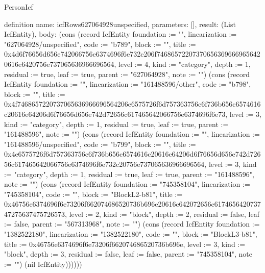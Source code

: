 \begin{lexlean}{PersonIcf}
\begin{semanticmodule}
definition{
  name: icfRows627064928unspecified,
  parameters: [],
  result: (List IcfEntity),
  body: (cons (record IcfEntity {foundation := "", linearization := "627064928/unspecified", code := "b789", block := "", title := 0x4d6f76656d656e742066756e6374696f6e732c206f746865722073706563696669656420616e6420756e737065636966696564, level := 4, kind := "category", depth := 1, residual := true, leaf := true, parent := "627064928", note := ""}) (cons (record IcfEntity {foundation := "", linearization := "161488596/other", code := "b798", block := "", title := 0x4f7468657220737065636966696564206e6575726f6d757363756c6f736b656c6574616c20616e64206d6f76656d656e742d72656c617465642066756e6374696f6e73, level := 3, kind := "category", depth := 1, residual := true, leaf := true, parent := "161488596", note := ""}) (cons (record IcfEntity {foundation := "", linearization := "161488596/unspecified", code := "b799", block := "", title := 0x4e6575726f6d757363756c6f736b656c6574616c20616e64206d6f76656d656e742d72656c617465642066756e6374696f6e732c20756e737065636966696564, level := 3, kind := "category", depth := 1, residual := true, leaf := true, parent := "161488596", note := ""}) (cons (record IcfEntity {foundation := "745358104", linearization := "745358104", code := "", block := "BlockL2-b81", title := 0x46756e6374696f6e73206f662074686520736b696e20616e642072656c617465642073747275637475726573, level := 2, kind := "block", depth := 2, residual := false, leaf := false, parent := "567313968", note := ""}) (cons (record IcfEntity {foundation := "1382522180", linearization := "1382522180", code := "", block := "BlockL3-b81", title := 0x46756e6374696f6e73206f662074686520736b696e, level := 3, kind := "block", depth := 3, residual := false, leaf := false, parent := "745358104", note := ""}) (nil IcfEntity))))))
}


\end{semanticmodule}
\end{lexlean}
